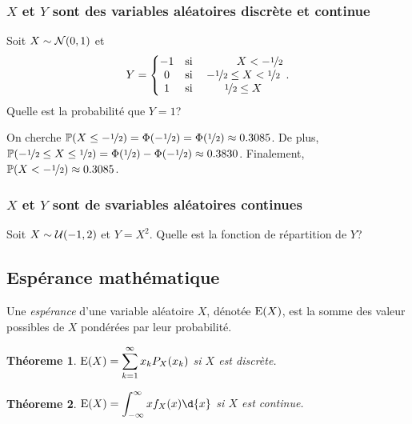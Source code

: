 \documentclass[11pt]{article}
\renewcommand\P{%
	\ensuremath{%
		\mathbb{P}%
	}%
}%
\newcommand\uni{%
	\ensuremath{%
		\mathcal{U}%
	}%
}%
\newcommand\Norm{%
	\ensuremath{%
		\mathcal{N}%
	}%
}%
\newcommand\Esp{%
	\ensuremath{%
		\mathrm{E}%
	}%
}%
\newtheorem{theoreme}{Théoreme}[section]
\begin{document}
\subsubsection{$X$ et $Y$ sont des variables aléatoires discrète et continue}
\begin{exemple}
	Soit $X\sim\Norm(0,1)$ et
	\begin{equation*}
		Y=\left\{
			\begin{matrix}
				-1&\text{si}&\phantom{-\nicefrac{1}{2}\leq}X<-\nicefrac{1}{2}\\
				 0&\text{si}&-\nicefrac{1}{2}\leq X<\nicefrac{1}{2}\\
				 1&\text{si}&\nicefrac{1}{2}\leq X\\
			\end{matrix}
		\right..
	\end{equation*}
	Quelle est la probabilité que $Y=1$?

	On cherche $\P(X\leq-\nicefrac{1}{2})=\Phi(-\nicefrac{1}{2})=
	\Phi(\nicefrac{1}{2})\approx\SI{0.3085}{}$. De plus, $\P(-\nicefrac{1}{2}
	\leq X\leq\nicefrac{1}{2})=\Phi(\nicefrac{1}{2})-\Phi(-\nicefrac{1}{2})
	\approx\SI{0.3830}{}$. Finalement, $\P(X<-\nicefrac{1}{2})\approx
	\SI{0.3085}{}$.
\end{exemple}

\subsubsection{$X$ et $Y$ sont de svariables aléatoires continues}
\begin{exemple}
	Soit $X\sim\uni(-1,2)$ et $Y=X^2$. Quelle est la fonction de répartition de
	$Y$?
\end{exemple}

\subsection{Espérance mathématique}
\begin{definition}
	Une \textit{espérance} d'une variable aléatoire $X$, dénotée $\Esp(X)$, est
	la somme des valeur possibles de $X$ pondérées par leur probabilité.
\end{definition}

\begin{theoreme}
	$\Esp(X)=\displaystyle\sum_{k=1}^\infty x_kP_X(x_k)$ si $X$ est discrète.
\end{theoreme}

\begin{theoreme}
	$\Esp(X)=\displaystyle\int_{-\infty}^\infty xf_X(x)\d{x}$ si $X$ est
	continue.
\end{theoreme}
\end{document}
